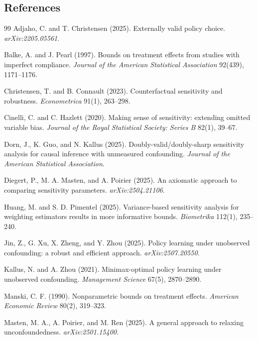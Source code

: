 \documentclass[11pt]{article}
\theoremstyle{definition}
\theoremstyle{plain}
\theoremstyle{remark}
\begin{document}
\subsection*{References}
\begin{thebibliography}{99}
Adjaho, C. and T. Christensen (2025).
Externally valid policy choice.
\emph{arXiv:2205.05561}.

Balke, A. and J. Pearl (1997).
Bounds on treatment effects from studies with imperfect compliance.
\emph{Journal of the American Statistical Association} 92(439), 1171--1176.

Christensen, T. and B. Connault (2023).
Counterfactual sensitivity and robustness.
\emph{Econometrica} 91(1), 263--298.

Cinelli, C. and C. Hazlett (2020).
Making sense of sensitivity: extending omitted variable bias.
\emph{Journal of the Royal Statistical Society: Series B} 82(1), 39--67.

Dorn, J., K. Guo, and N. Kallus (2025).
Doubly-valid/doubly-sharp sensitivity analysis for causal inference with unmeasured confounding.
\emph{Journal of the American Statistical Association}.

Diegert, P., M. A. Masten, and A. Poirier (2025).
An axiomatic approach to comparing sensitivity parameters.
\emph{arXiv:2504.21106}.

Huang, M. and S. D. Pimentel (2025).
Variance-based sensitivity analysis for weighting estimators results in more informative bounds.
\emph{Biometrika} 112(1), 235--240.

Jin, Z., G. Xu, X. Zheng, and Y. Zhou (2025).
Policy learning under unobserved confounding: a robust and efficient approach.
\emph{arXiv:2507.20550}.

Kallus, N. and A. Zhou (2021).
Minimax-optimal policy learning under unobserved confounding.
\emph{Management Science} 67(5), 2870--2890.

Manski, C. F. (1990).
Nonparametric bounds on treatment effects.
\emph{American Economic Review} 80(2), 319--323.

Masten, M. A., A. Poirier, and M. Ren (2025).
A general approach to relaxing unconfoundedness.
\emph{arXiv:2501.15400}.


\end{thebibliography}
\end{document}
